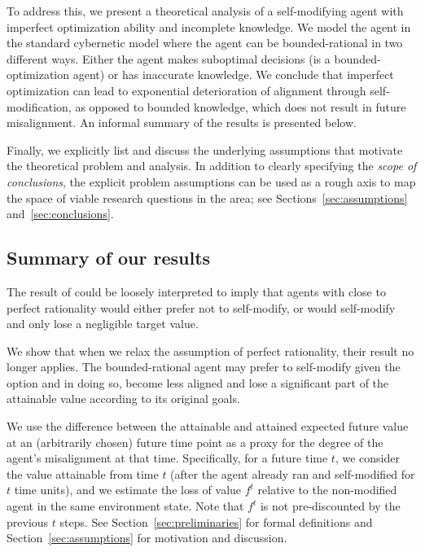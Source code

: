 \smallskip
To address this, we present a theoretical analysis of a self-modifying agent with imperfect optimization ability and incomplete knowledge. We model the agent in the standard cybernetic model where the agent can be bounded-rational in two different ways. Either the agent makes suboptimal decisions (is a bounded-optimization agent) or has inaccurate knowledge. We conclude that imperfect optimization can lead to exponential deterioration of alignment through self-modification, as opposed to bounded knowledge, which does not result in future misalignment. An informal summary of the results is presented below.

\smallskip
Finally, we explicitly list and discuss the underlying assumptions that motivate the theoretical problem and analysis. In addition to clearly specifying the \emph{scope of conclusions}, the explicit problem assumptions can be used as a rough axis to map the space of viable research questions in the area; see Sections~\ref{sec:assumptions} and~\ref{sec:conclusions}.

\subsection{Summary of our results} \label{sec:summary}

The result of \citet{everitt} could be loosely interpreted to imply that agents with close to perfect rationality would either prefer not to self-modify, or would self-modify and only lose a negligible target value. 

We show that when we relax the assumption of perfect rationality, their result no longer applies. The bounded-rational agent may prefer to self-modify given the option and in doing so, become less aligned and lose a significant part of the attainable value according to its original goals.

\smallskip
We use the difference between the attainable and attained expected future value at an (arbitrarily chosen) future time point as a proxy for the degree of the agent's misalignment at that time. Specifically, for a future time $t$, we consider the value attainable from time $t$ (after the agent already ran and self-modified for $t$ time units), and we estimate the loss of value $f^t$ relative to the non-modified agent in the same environment state. Note that $f^t$ is not pre-discounted by the previous $t$ steps. See Section~\ref{sec:preliminaries} for formal definitions and Section~\ref{sec:assumptions} for motivation and discussion.

